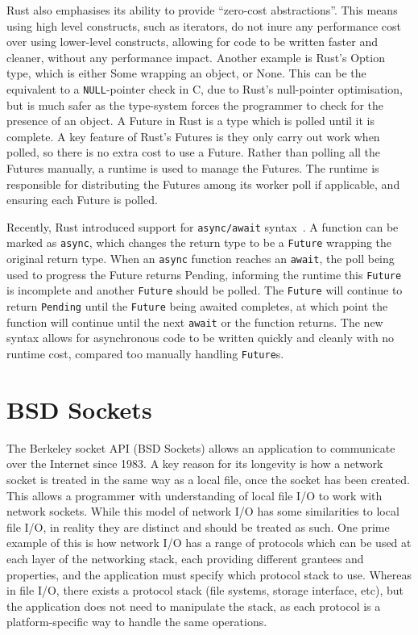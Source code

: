 Rust also emphasises its ability to provide “zero-cost abstractions”.
This means using high level constructs, such as iterators, do not inure any performance cost over using lower-level
constructs, allowing for code to be written faster and cleaner, without any performance impact.
Another example is Rust's Option type, which is either Some wrapping an object, or None.
This can be the equivalent to a \texttt{NULL}-pointer check in C, due to Rust's null-pointer optimisation, but is much
safer as the type-system forces the programmer to check for the presence of an object.
A Future in Rust is a type which is polled until it is complete.
A key feature of Rust's Futures is they only carry out work when polled, so there is no extra cost to use a Future.
Rather than polling all the Futures manually, a runtime is used to manage the Futures.
The runtime is responsible for distributing the Futures among its worker poll if applicable, and ensuring each Future is
polled.

Recently, Rust introduced support for \texttt{async/await} syntax~\citep{withoutboats_asyncawaitnotation_}.
A function can be marked as \texttt{async}, which changes the return type to be a \texttt{Future} wrapping the original
return type.
When an \texttt{async} function reaches an \texttt{await}, the poll being used to progress the Future returns Pending,
informing the runtime this \texttt{Future} is incomplete and another \texttt{Future} should be polled.
The \texttt{Future} will continue to return \texttt{Pending} until the \texttt{Future} being awaited completes,
at which point the function will continue until the next \texttt{await} or the function returns.
The new syntax allows for asynchronous code to be written quickly and cleanly with no runtime cost, compared too
manually handling \texttt{Future}s.

\section{BSD Sockets}\label{sec:bsd-sockets}
The Berkeley socket API (BSD Sockets) allows an application to communicate over the Internet since 1983.
A key reason for its longevity is how a network socket is treated in the same way as a local file, once the socket has
been created.
This allows a programmer with understanding of local file I/O to work with network sockets.
While this model of network I/O has some similarities to local file I/O, in reality they are distinct and should be
treated as such.
One prime example of this is how network I/O has a range of protocols which can be used at each layer of the networking
stack, each providing different grantees and properties, and the application must specify which protocol stack to use.
Whereas in file I/O, there exists a protocol stack (file systems, storage interface, etc), but the application does not
need to manipulate the stack, as each protocol is a platform-specific way to handle the same operations.

